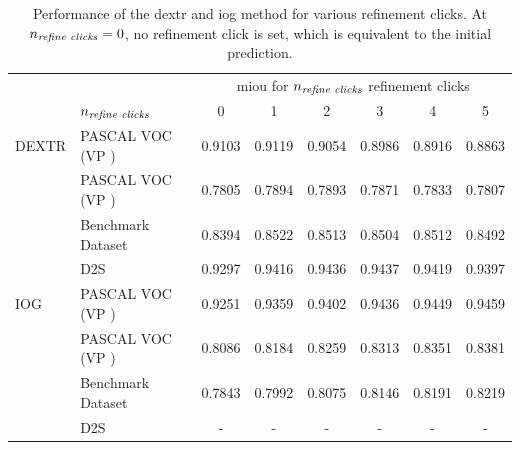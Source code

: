 \begin{table}[h!]
	\centering
	\begin{tabular}{l l|c c c c c c}
		\toprule
				&						& \multicolumn{6}{c}{\gls{miou} for $ n_{\textnormal{\textit{refine clicks}}} $ refinement clicks } \\
				& {$ n_{\textnormal{\textit{refine clicks}}} $} 
										& 0			& 1			& 2			& 3 		& 4 		& 5			\\
		\midrule
		DEXTR 	& PASCAL VOC (VP \cmark)	& 0.9103	& 0.9119	& 0.9054	& 0.8986 	& 0.8916	& 0.8863	\\
			 	& PASCAL VOC (VP \xmark)	& 0.7805	& 0.7894 	& 0.7893	& 0.7871 	& 0.7833	& 0.7807	\\
				& Benchmark Dataset		& 0.8394	& 0.8522 	& 0.8513	& 0.8504 	& 0.8512	& 0.8492	\\
				& D2S					& 0.9297	& 0.9416 	& 0.9436	& 0.9437 	& 0.9419	& 0.9397	\\
		\midrule
		IOG 	& PASCAL VOC (VP \cmark)	& 0.9251	& 0.9359	& 0.9402	& 0.9436 	& 0.9449	& 0.9459	\\
				& PASCAL VOC (VP \xmark)	& 0.8086	& 0.8184	& 0.8259	& 0.8313 	& 0.8351	& 0.8381	\\
				& Benchmark Dataset		& 0.7843	& 0.7992 	& 0.8075	& 0.8146 	& 0.8191	& 0.8219	\\
				& D2S					& -		& - 	& -		& - 	& -		& -		\\
		\bottomrule
	\end{tabular}
	\caption[Generalization of IOG and DEXTR Refinement]{
		Performance of the \gls{dextr} and \gls{iog} method for various refinement clicks.
		At $ n_{\textnormal{\textit{refine clicks}}} = 0 $, no refinement click is set, which is equivalent to the initial prediction.
	}\label{tab:ch5:tests_on_refinement datasets}
\end{table}
